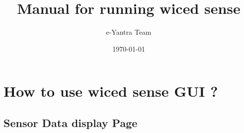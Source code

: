 \documentclass[11pt,a4paper]{article}
\begin{document}
\begin{titlepage}
\title{Manual for running wiced sense}
\author{e-Yantra Team}
\date{\today}
\maketitle
\end{titlepage}

\tableofcontents
    \newpage
	\section{How to use wiced sense GUI ?}
	\subsection{Sensor Data display Page}
	
\end{document}
